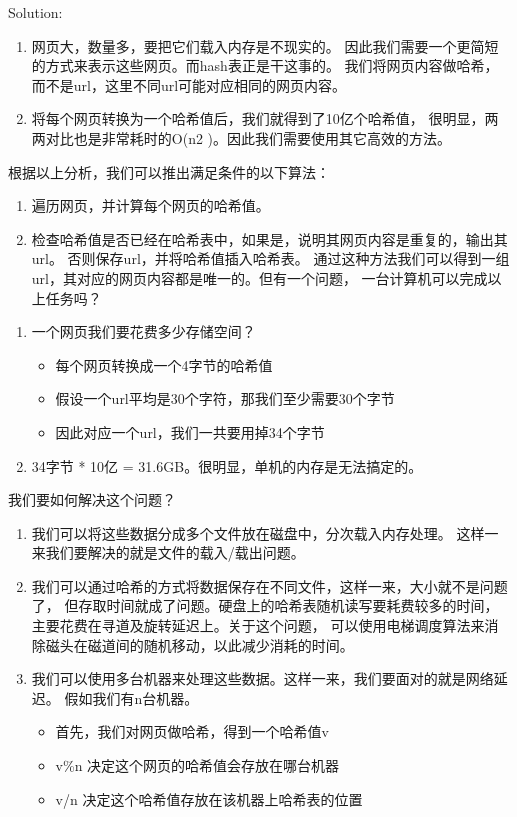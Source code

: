 \begin{description}
Solution: 
\begin{enumerate}
\item 网页大，数量多，要把它们载入内存是不现实的。 因此我们需要一个更简短的方式来表示这些网页。而hash表正是干这事的。 我们将网页内容做哈希，而不是url，这里不同url可能对应相同的网页内容。
\item 将每个网页转换为一个哈希值后，我们就得到了10亿个哈希值， 很明显，两两对比也是非常耗时的O(n2 )。因此我们需要使用其它高效的方法。
\end{enumerate}
根据以上分析，我们可以推出满足条件的以下算法：
\begin{enumerate}
\item 遍历网页，并计算每个网页的哈希值。
\item 检查哈希值是否已经在哈希表中，如果是，说明其网页内容是重复的，输出其url。 否则保存url，并将哈希值插入哈希表。
  通过这种方法我们可以得到一组url，其对应的网页内容都是唯一的。但有一个问题， 一台计算机可以完成以上任务吗？
\end{enumerate}
\begin{enumerate}
\item 一个网页我们要花费多少存储空间？
  \begin{itemize}
  \item 每个网页转换成一个4字节的哈希值
  \item 假设一个url平均是30个字符，那我们至少需要30个字节
  \item 因此对应一个url，我们一共要用掉34个字节
  \end{itemize}
\item 34字节 * 10亿 = 31.6GB。很明显，单机的内存是无法搞定的。
\end{enumerate}
我们要如何解决这个问题？
\begin{enumerate}
\item 我们可以将这些数据分成多个文件放在磁盘中，分次载入内存处理。 这样一来我们要解决的就是文件的载入/载出问题。

\item 我们可以通过哈希的方式将数据保存在不同文件，这样一来，大小就不是问题了， 但存取时间就成了问题。硬盘上的哈希表随机读写要耗费较多的时间， 主要花费在寻道及旋转延迟上。关于这个问题， 可以使用电梯调度算法来消除磁头在磁道间的随机移动，以此减少消耗的时间。

\item 我们可以使用多台机器来处理这些数据。这样一来，我们要面对的就是网络延迟。 假如我们有n台机器。
  \begin{itemize}
  \item 首先，我们对网页做哈希，得到一个哈希值v
  \item v\%n 决定这个网页的哈希值会存放在哪台机器
  \item v/n 决定这个哈希值存放在该机器上哈希表的位置
  \end{itemize}
\end{enumerate}



\end{description}
